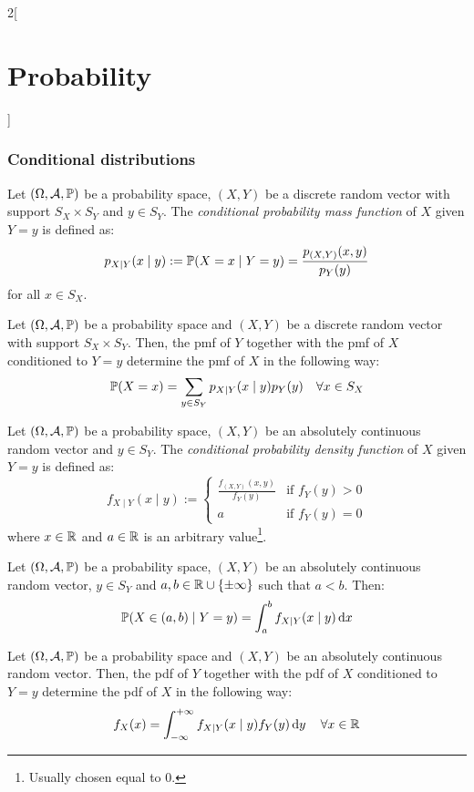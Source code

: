 \documentclass[../../../main.tex]{subfiles}
\begin{document}
\begin{multicols}{2}[\section{Probability}]
  \subsubsection{Conditional distributions}
  \begin{definition}
    Let $(\Omega,\mathcal{A},\mathbb{P})$ be a probability space, $(X,Y)$ be a discrete random vector with support $S_X\times S_Y$ and $y\in S_Y$. The \emph{conditional probability mass function} of $X$ given $Y=y$ is defined as: $$p_{X\mid Y}(x\mid y):=\mathbb{P}(X=x\mid Y=y)=\frac{p_{(X,Y)}(x,y)}{p_Y(y)}$$ for all $x\in S_X$.
  \end{definition}
  \begin{proposition}
    Let $(\Omega,\mathcal{A},\mathbb{P})$ be a probability space and $(X,Y)$ be a discrete random vector with support $S_X\times S_Y$. Then, the pmf of $Y$ together with the pmf of $X$ conditioned to $Y=y$ determine the pmf of $X$ in the following way: $$\mathbb{P}(X=x)=\sum_{y\in S_Y}p_{X\mid Y}(x\mid y)p_Y(y)\quad\forall x\in S_X$$
  \end{proposition}
  \begin{definition}
    Let $(\Omega,\mathcal{A},\mathbb{P})$ be a probability space, $(X,Y)$ be an absolutely continuous random vector and $y\in S_Y$. The \emph{conditional probability density function} of $X$ given $Y=y$ is defined as: $$f_{X\mid Y}(x\mid y):=
      \begin{cases}
        \frac{f_{(X,Y)}(x,y)}{f_Y(y)} & \text{if }f_Y(y)>0 \\
        a                             & \text{if }f_Y(y)=0
      \end{cases}
    $$ where $x\in\mathbb{R}$ and $a\in\mathbb{R}$ is an arbitrary value\footnote{Usually chosen equal to 0.}.
  \end{definition}
  \begin{proposition}
    Let $(\Omega,\mathcal{A},\mathbb{P})$ be a probability space, $(X,Y)$ be an absolutely continuous random vector, $y\in S_Y$ and $a,b\in\mathbb{R}\cup\{\pm\infty\}$ such that $a<b$. Then: $$\mathbb{P}(X\in(a,b)\mid Y=y)=\int_a^bf_{X\mid Y}(x\mid y)\dd{x}$$
  \end{proposition}
  \begin{proposition}
    Let $(\Omega,\mathcal{A},\mathbb{P})$ be a probability space and $(X,Y)$ be an absolutely continuous random vector. Then, the pdf of $Y$ together with the pdf of $X$ conditioned to $Y=y$ determine the pdf of $X$ in the following way: $$f_X(x)=\int_{-\infty}^{+\infty}f_{X\mid Y}(x\mid y)f_Y(y)\dd{y}\quad\forall x\in\mathbb{R}$$
  \end{proposition}

\end{multicols}
\end{document}
